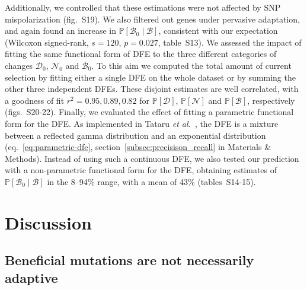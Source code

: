 \documentclass{article}
\newcommand{\proba}{\mathbb{P}}
\newcommand{\SphyDel}{\mathcal{D}_0}
\newcommand{\SphyNeu}{\mathcal{N}_0}
\newcommand{\SphyBen}{\mathcal{B}_0}
\newcommand{\given}{\mid}
\newcommand{\SpopDel}{\mathcal{D}}
\newcommand{\SpopNeu}{\mathcal{N}}
\newcommand{\SpopBen}{\mathcal{B}}
\begin{document}
    Additionally, we controlled that these estimations were not affected by SNP mispolarization (fig.~S19).
    We also filtered out genes under pervasive adaptation, and again found an increase in $\proba [ \SphyBen \given \SpopBen]$, consistent with our expectation (Wilcoxon signed-rank, $s=120$, $p=0.027$, table~S13).
    We assessed the impact of fitting the same functional form of DFE to the three different categories of changes $\SphyDel$, $\SphyNeu$ and $\SphyBen$.
    To this aim we computed the total amount of current selection by fitting either a single DFE on the whole dataset or by summing the other three independent DFEs.
    These disjoint estimates are well correlated, with a goodness of fit $r^2={0.95, 0.89, 0.82}$ for $\proba [\SpopDel]$, $\proba [\SpopNeu]$ and $\proba [\SpopBen]$, respectively (figs.~S20-22).
    Finally, we evaluated the effect of fitting a parametric functional form for the DFE.
    As implemented in Tataru \textit{et al.}~\cite{tataru_inference_2017}, the DFE is a mixture between a reflected gamma distribution and an exponential distribution (eq.~\ref{eq:parametric-dfe}, section~\ref{subsec:precisison_recall} in Materials \& Methods).
    Instead of using such a continuous DFE, we also tested our prediction with a non-parametric functional form for the DFE, obtaining estimates of $\proba [ \SphyBen \given \SpopBen]$ in the 8--94\% range, with a mean of 43\% (tables~S14-15).

    \section*{Discussion}
    \subsection*{Beneficial mutations are not necessarily adaptive}
\end{document}

